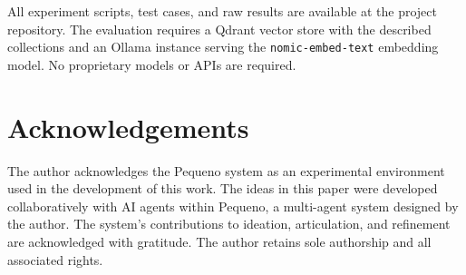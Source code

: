 \documentclass{article}
\begin{document}
All experiment scripts, test cases, and raw results are available at the project repository. The evaluation requires a Qdrant vector store with the described collections and an Ollama instance serving the \texttt{nomic-embed-text} embedding model. No proprietary models or APIs are required.
\section*{Acknowledgements}
The author acknowledges the Pequeno system as an experimental environment used in the development of this work. The ideas in this paper were developed collaboratively with AI agents within Pequeno, a multi-agent system designed by the author. The system's contributions to ideation, articulation, and refinement are acknowledged with 
gratitude. The author retains sole authorship and all associated rights.
\end{document}
